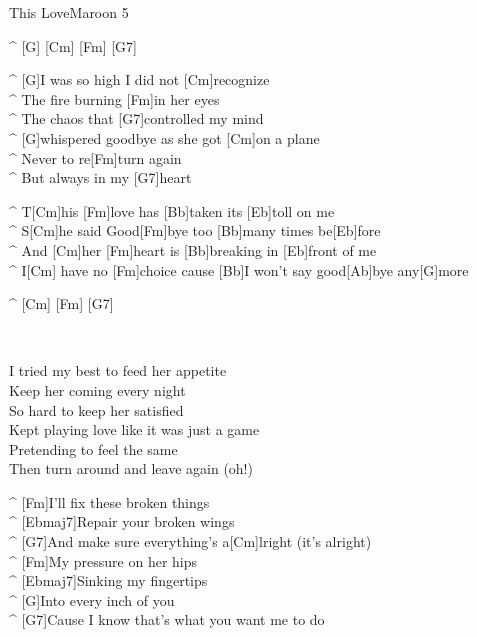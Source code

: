 \begin{song}{This Love}{Maroon 5}

\begin{guitar}
^ [G] [Cm] [Fm] [G7]\\

\end{guitar}
\begin{guitar}
^ [G]I was so high I did not [Cm]recognize\\
^ The fire burning [Fm]in her eyes\\
^ The chaos that [G7]controlled my mind\\
^ [G]whispered goodbye as she got [Cm]on a plane\\
^ Never to re[Fm]turn again\\
^ But always in my [G7]heart\\
\end{guitar}


\begin{guitar}
^ T[Cm]his [Fm]love has [Bb]taken its [Eb]toll on me\\
^ S[Cm]he said Good[Fm]bye too [Bb]many times be[Eb]fore\\
^ And [Cm]her [Fm]heart is [Bb]breaking in [Eb]front of me\\
^ I[Cm] have no [Fm]choice cause [Bb]I won't say good[Ab]bye any[G]more\\
\end{guitar}

\begin{guitar}
^ [Cm] [Fm] [G7]\\
\end{guitar}

\\
\begin{guitar}
I tried my best to feed her appetite\\
Keep her coming every night\\
So hard to keep her satisfied\\
Kept playing love like it was just a game\\
Pretending to feel the same\\
Then turn around and leave again  (oh!)\\
\end{guitar}


\begin{guitar}
^ [Fm]I'll fix these broken things\\
^ [Ebmaj7]Repair your broken wings\\
^ [G7]And make sure everything's a[Cm]lright (it's alright)\\
^ [Fm]My pressure on her hips\\
^ [Ebmaj7]Sinking my fingertips\\
^ [G]Into every inch of you\\
^ [G7]Cause I know that's what you want me to do\\
\end{guitar}

\end{song}
